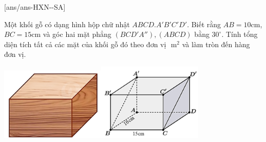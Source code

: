 \caukq
{}[ans/ans-HXN-\sode-SA]
\begin{ex}%
    Một khối gỗ có dạng hình hộp chữ nhật $ ABCD.A'B'C'D'$. Biết rằng $AB=10$cm, $BC=15$cm và góc hai mặt phẳng $\left(BCD'A''\right),\left(ABCD\right)$ bằng $30^\circ$. Tính tổng diện tích tất cả các mặt của khối gỗ đó theo đơn vị $ $ m$^2$ và làm tròn đến hàng đơn vị.\\
    \centerline{
    \includegraphics[width=5cm]{img/HXN-10-17-a}\qquad \includegraphics[width=5cm]{img/HXN-10-17-b}
    }
    \end{ex}
    
